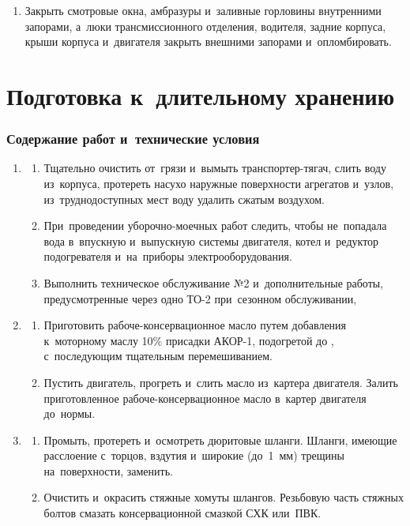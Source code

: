 \begin{enumerate}
    \item Закрыть смотровые окна, амбразуры и~заливные горловины внутренними запорами, а~люки трансмиссионного отделения, водителя, задние корпуса, крыши корпуса и~двигателя закрыть внешними запорами и~опломбировать.

\end{enumerate}


\section{Подготовка к~длительному хранению}
\subsubsection{Содержание работ и~технические условия}
\begin{enumerate}
    \item \begin{enumerate}
        \item 
        Тщательно очистить от~грязи и~вымыть транспортер-тягач, слить воду из~корпуса, протереть насухо наружные поверхности агрегатов и~узлов, из~труднодоступных мест воду удалить сжатым воздухом. 
        \item 
        При~проведении уборочно-моечных работ следить, чтобы не~попадала вода в~впускную и~выпускную системы двигателя, котел и~редуктор подогревателя и~на~приборы электрооборудования. 
        \item 
        Выполнить техническое обслуживание №2 и~дополнительные работы, предусмотренные через одно ТО-2 при~сезонном обслуживании, 
    \end{enumerate}

    \item \begin{enumerate}
        \item 
        Приготовить рабоче-консервационное масло путем добавления к~моторному маслу 10\% присадки АКОР-1, подогретой до \celc{}, с~последующим тщательным перемешиванием. 
        \item 
        Пустить двигатель, прогреть и~слить масло из~картера двигателя. Залить приготовленное рабоче-консервационное масло в~картер двигателя до~нормы. 
    \end{enumerate}

    \item \begin{enumerate}
        \item 
        Промыть, протереть и~осмотреть дюритовые шланги. Шланги, имеющие расслоение с~торцов, вздутия и~широкие (до~1~мм) трещины на~поверхности, заменить. 
        \item 
        Очистить и~окрасить стяжные хомуты шлангов. Резьбовую часть стяжных болтов смазать консервационной смазкой СХК или~ПВК. 
    \end{enumerate}


\end{enumerate}

